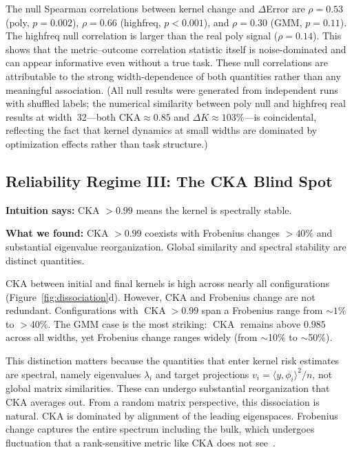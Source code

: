 \documentclass[twoside,11pt]{article}
\newcommand{\cca}{{\operatorname{CKA}}}
\begin{document}
The null Spearman correlations between kernel change and $\Delta$Error are $\rho=0.53$ (poly, $p=0.002$), $\rho=0.66$ (highfreq, $p<0.001$), and $\rho=0.30$ (GMM, $p=0.11$).  The highfreq null correlation is larger than the real poly signal ($\rho=0.14$). This shows that the metric--outcome correlation statistic itself is noise-dominated and can appear informative even without a true task.  These null correlations are attributable to the strong width-dependence of both quantities rather than any meaningful association. (All null results were generated from independent runs with shuffled labels; the numerical similarity between poly null and highfreq real results at width~32---both $\text{CKA}\approx0.85$ and $\Delta K\approx103\%$---is coincidental, reflecting the fact that kernel dynamics at small widths are dominated by optimization effects rather than task structure.)

\subsection{Reliability Regime III: The CKA Blind Spot}
\label{sec:cka}

\noindent\textbf{Intuition says:} CKA $>0.99$ means the kernel is spectrally stable.

\noindent\textbf{What we found:} CKA $>0.99$ coexists with Frobenius changes $>40\%$ and substantial eigenvalue reorganization. Global similarity and spectral stability are distinct quantities.

CKA between initial and final kernels is high across nearly all configurations (Figure~\ref{fig:dissociation}d).  However, CKA and Frobenius change are not redundant.  Configurations with $\cca>0.99$ span a Frobenius range from $\sim1\%$ to $>40\%$.  The GMM case is the most striking: $\cca$ remains above $0.985$ across all widths, yet Frobenius change ranges widely (from $\sim$10\% to $\sim$50\%).

This distinction matters because the quantities that enter kernel risk estimates~\citep{canatar2021spectral} are spectral, namely eigenvalues $\lambda_{i}$ and target projections $v_{i}=\langle y,\phi_{i}\rangle^{2}/n$, not global matrix similarities.  These can undergo substantial reorganization that CKA averages out.  From a random matrix perspective, this dissociation is natural. CKA is dominated by alignment of the leading eigenspaces. Frobenius change captures the entire spectrum including the bulk, which undergoes fluctuation that a rank-sensitive metric like CKA does not see~\citep{el1998concentration,vyas2023statistical}.
\end{document}
